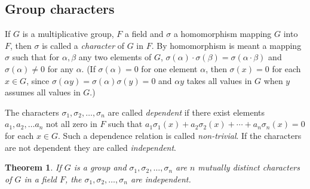 \documentclass[11pt]{article}
\newtheorem{theo}{Theorem}
\theoremstyle{definition}
\begin{document}
\subsection{Group characters}

If $G$ is a multiplicative group, $F$ a field and $\sigma$ a homomorphism mapping $G$ into $F$, then $\sigma$ is called a \emph{character} of $G$ in $F$.
By homomorphism is meant a mapping $\sigma$ such that for $\alpha, \beta$ any two elements of $G$, $\sigma(\alpha) \cdot \sigma(\beta) = \sigma(\alpha \cdot \beta)$ and $\sigma(\alpha) \not= 0$ for any $\alpha$.
(If $\sigma(\alpha) = 0$ for one element $\alpha$, then $\sigma(x) = 0$ for each $x \in G$, since $\sigma(\alpha y) = \sigma(\alpha) \sigma(y) = 0$ and $\alpha y$ takes all values in $G$ when $y$ assumes all values in $G$.)

The characters $\sigma_1, \sigma_2, \ldots, \sigma_n$ are called \emph{dependent} if there exist elements $a_1, a_2, \ldots a_n$ not all zero in $F$ such that $a_1 \sigma_1(x) + a_2 \sigma_2(x) + \cdots + a_n \sigma_n(x) = 0$ for each $x \in G$.
Such a dependence relation is called \emph{non-trivial}.
If the characters are not dependent they are called \emph{independent}.


\begin{theo}
\label{theo:ontw}
If $G$ is a group and $\sigma_1, \sigma_2, \ldots, \sigma_n$ are $n$ mutually distinct characters of $G$ in a field $F$, the $\sigma_1, \sigma_2, \ldots, \sigma_n$ are independent.
\end{theo}
\end{document}
